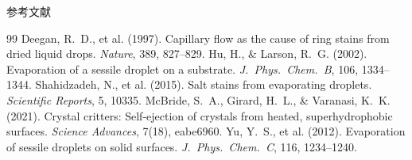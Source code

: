 \documentclass[aspectratio=169, 12pt]{beamer}
\begin{document}
\begin{frame}[allowframebreaks]{参考文献}
  \small
  \begin{thebibliography}{99}
     Deegan, R.~D., et al. (1997). Capillary flow as the cause of ring stains from dried liquid drops. \textit{Nature}, 389, 827–829.
     Hu, H., \& Larson, R.~G. (2002). Evaporation of a sessile droplet on a substrate. \textit{J.~Phys.~Chem.~B}, 106, 1334–1344.
     Shahidzadeh, N., et al. (2015). Salt stains from evaporating droplets. \textit{Scientific Reports}, 5, 10335.
     McBride, S.~A., Girard, H.~L., \& Varanasi, K.~K. (2021). Crystal critters: Self-ejection of crystals from heated, superhydrophobic surfaces. \textit{Science Advances}, 7(18), eabe6960.
     Yu, Y.~S., et al. (2012). Evaporation of sessile droplets on solid surfaces. \textit{J.~Phys.~Chem.~C}, 116, 1234–1240.
  \end{thebibliography}
\end{frame}
\end{document}
